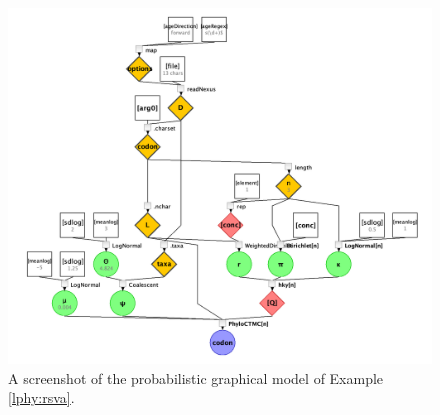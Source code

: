 \documentclass[12pt]{article} %
\begin{document}

\begin{figure}
  \includegraphics[width=\textwidth]{figs_plos/RSV2.png} 
  \caption{A screenshot of the probabilistic graphical model of Example \ref{lphy:rsva}.} 
  \label{fig:RSV2PGM}
\end{figure}


\clearpage


\bigskip












\end{document}
